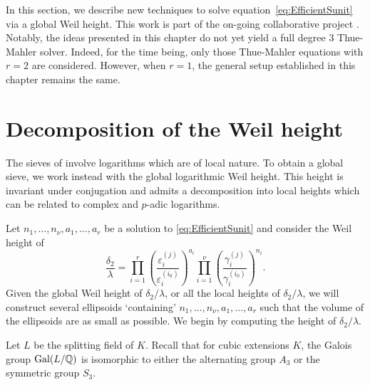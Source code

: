 In this section, we describe new techniques to solve equation~\eqref{eq:EfficientSunit} via a global Weil height. This work is part of the on-going collaborative project \cite{GhKaMaSi}. Notably, the ideas presented in this chapter do not yet yield a full degree $3$ Thue-Mahler solver. Indeed, for the time being, only those Thue-Mahler equations with $r = 2$ are considered. However, when $r = 1$, the general setup established in this chapter remains the same. 

\section{Decomposition of the Weil height} 
\label{sec:DecompositionofWeilHeight}

The sieves of \cite{TW3} involve logarithms which are of local nature. To obtain a global sieve, we work instead with the global logarithmic Weil height. This height is invariant under conjugation and admits a decomposition into local heights which can be related to complex and $p$-adic logarithms. 

Let $n_1, \dots, n_{\nu}, a_1, \dots, a_r$ be a solution to \eqref{eq:EfficientSunit} and consider the Weil height of
\[\frac{\delta_2}{\lambda}= \prod_{i = 1}^{r}\left( \frac{\varepsilon_i^{(j)}}{\varepsilon_i^{(i_0)}}\right)^{a_i} \prod_{i = 1}^{\nu} \left( \frac{\gamma_i^{(j)}}{\gamma_i^{(i_0)}}\right)^{n_i}.\]
Given the global Weil height of $\delta_2/\lambda$, or all the local heights of $\delta_2/\lambda$, we will construct several ellipsoids `containing' $n_1, \dots, n_{\nu}, a_1, \dots, a_r$ such that the volume of the ellipsoids are as small as possible. We begin by computing the height of $\delta_2/\lambda$. 

Let $L$ be the splitting field of $K$. Recall that for cubic extensions $K$, the Galois group $\operatorname{Gal}(L/\mathbb{Q})$ is isomorphic to either the alternating group $A_3$ or the symmetric group $S_3$. 

